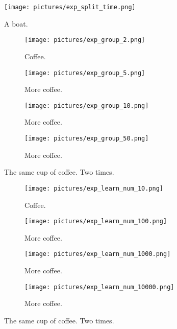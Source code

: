\documentclass{scrartcl}
\begin{document}
\begin{figure}[h!]
  \begin{center}
  \texttt{[image: pictures/exp\_split\_time.png]}
    \end{center}
  \caption{A boat.}
  \label{fig:boat2}
\end{figure}

\begin{figure}[h!]
  \centering
  \begin{subfigure}[b]{0.45\linewidth}
    \texttt{[image: pictures/exp\_group\_2.png]}
    \caption{Coffee.}
  \end{subfigure}\hfill%
  \begin{subfigure}[b]{0.45\linewidth}
    \texttt{[image: pictures/exp\_group\_5.png]}
    \caption{More coffee.}
  \end{subfigure}
    \begin{subfigure}[b]{0.45\linewidth}
    \texttt{[image: pictures/exp\_group\_10.png]}
    \caption{More coffee.}
  \end{subfigure}\hfill%
      \begin{subfigure}[b]{0.45\linewidth}
    \texttt{[image: pictures/exp\_group\_50.png]}
    \caption{More coffee.}
  \end{subfigure}
  \caption{The same cup of coffee. Two times.}
  \label{fig:approach}
\end{figure}

\begin{figure}[h!]
  \centering
  \begin{subfigure}[b]{0.45\linewidth}
    \texttt{[image: pictures/exp\_learn\_num\_10.png]}
    \caption{Coffee.}
  \end{subfigure}\hfill%
  \begin{subfigure}[b]{0.45\linewidth}
    \texttt{[image: pictures/exp\_learn\_num\_100.png]}
    \caption{More coffee.}
  \end{subfigure}
    \begin{subfigure}[b]{0.45\linewidth}
    \texttt{[image: pictures/exp\_learn\_num\_1000.png]}
    \caption{More coffee.}
  \end{subfigure}\hfill%
      \begin{subfigure}[b]{0.45\linewidth}
    \texttt{[image: pictures/exp\_learn\_num\_10000.png]}
    \caption{More coffee.}
  \end{subfigure}
  \caption{The same cup of coffee. Two times.}
  \label{fig:approach}
\end{figure}
\end{document}
